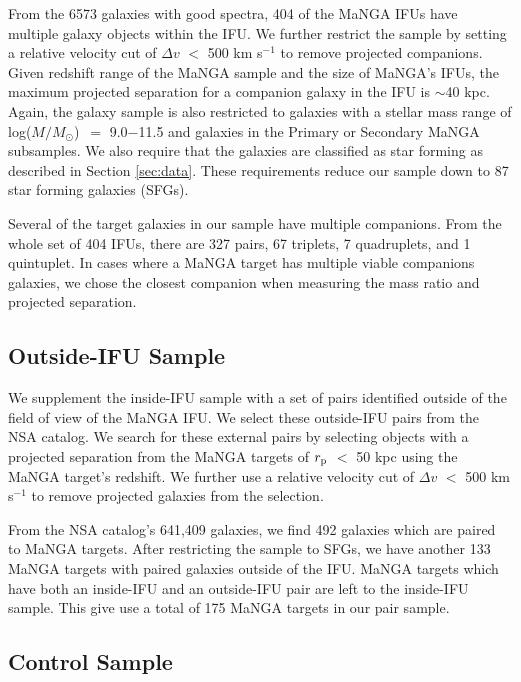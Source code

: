 \documentclass[iop,revtex4,twocolumn,apj,numberedappendix,appendixfloats]{emulateapj}
\newcommand{\logm}{log($M/M_{\odot}$)}
\begin{document}
From the 6573 galaxies with good spectra, 404 of the MaNGA IFUs have multiple galaxy objects within the IFU. We further restrict the sample by setting a relative velocity cut of $\Delta v$ $<$ 500 km s$^{-1}$ to remove projected companions. Given redshift range of the MaNGA sample and the size of MaNGA's IFUs, the maximum projected separation for a companion galaxy in the IFU is $\sim$40 kpc. Again, the galaxy sample is also restricted to galaxies with a stellar mass range of \logm\ $=$ 9.0$-$11.5 and galaxies in the Primary or Secondary MaNGA subsamples. We also require that the galaxies are classified as star forming as described in Section \ref{sec:data}. These requirements reduce our sample down to 87 star forming galaxies (SFGs). 

Several of the target galaxies in our sample have multiple companions. From the whole set of 404 IFUs, there are 327 pairs, 67 triplets, 7 quadruplets, and 1 quintuplet. In cases where a MaNGA target has multiple viable companions galaxies, we chose the closest companion when measuring the mass ratio and projected separation. 



\subsection{Outside-IFU Sample}\label{sec:outside}

We supplement the inside-IFU sample with a set of pairs identified outside of the field of view of the MaNGA IFU. We select these outside-IFU pairs from the NSA catalog. We search for these external pairs by selecting objects with a projected separation from the MaNGA targets of $r_{\rm p}$ $<$ 50 kpc using the MaNGA target's redshift. We further use a relative velocity cut of $\Delta v$ $<$ 500 km s$^{-1}$ to remove projected galaxies from the selection. 

From the NSA catalog's 641,409 galaxies, we find 492 galaxies which are paired to MaNGA targets. After restricting the sample to SFGs, we have another 133 MaNGA targets with paired galaxies outside of the IFU. MaNGA targets which have both an inside-IFU and an outside-IFU pair are left to the inside-IFU sample. This give use a total of 175 MaNGA targets in our pair sample.

\subsection{Control Sample}\label{sec:control}
\end{document}

